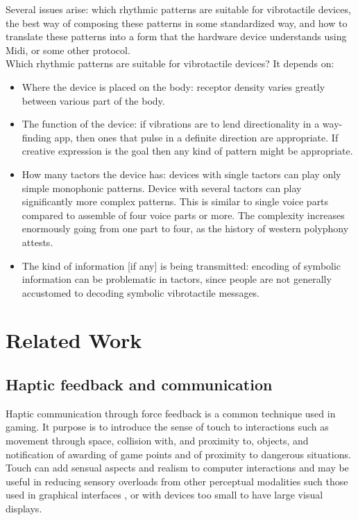 \documentclass[a4paper, twocolumn]{article}
\begin{document}
Several issues arise: which rhythmic patterns are suitable for vibrotactile devices, the best way of composing these patterns in some standardized way, and how to translate these patterns into a form that the hardware device understands using Midi, or some other protocol.\\

Which rhythmic patterns are suitable for vibrotactile devices? It depends on:

\begin{itemize}
\item Where the device is placed on the body: receptor density varies greatly between various part of the body. 
\item The function of the device: if vibrations are to lend directionality in a way-finding app, then ones that pulse in a definite direction are appropriate. If creative expression is the goal then any kind of pattern might be appropriate.
\item How many tactors the device has: devices with single tactors can play only simple monophonic patterns. Device with several tactors can play significantly more complex patterns. This is similar to single voice parts compared to assemble of four voice parts or more. The complexity increases enormously going from one part to four, as the history of western polyphony attests. 
\item The kind of information [if any] is being transmitted: encoding of symbolic information can be problematic in tactors, since people are not generally accustomed to decoding symbolic vibrotactile messages. 
\end{itemize}

\section{Related Work}

\subsection{Haptic feedback and communication}
Haptic communication through force feedback is a common technique used in gaming. It purpose is to introduce the sense of touch to interactions such as movement through space, collision with, and proximity to, objects, and notification of awarding of game points and of proximity to dangerous situations. Touch can add sensual aspects and realism to computer interactions and may be useful in reducing sensory overloads from other perceptual modalities such those used in graphical interfaces \cite{oakley2000putting}, or with devices too small to have large visual displays.\\
\end{document}
